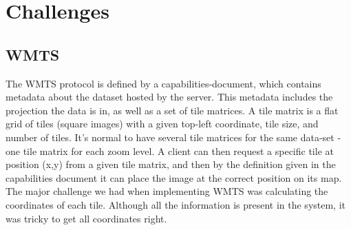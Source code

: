 \documentclass[11pt,a4paper,titlepage,oneside]{report}
\begin{document}
\chapter{Challenges}
\label{chap:Challenges}
\section{WMTS}
\label{sec:WMTS}
The \gls{WMTS} \gls{protocol} is defined by a capabilities-document, which contains metadata about the dataset hosted by the server. This metadata includes the projection the data is in, as well as a set of tile matrices.  
A tile matrix is a flat grid of tiles (square images) with a given top-left coordinate, tile size, and number of tiles. It's normal to have several tile matrices for the same data-set - one tile matrix for each zoom level.  
A client can then request a specific tile at position (x,y) from a given tile matrix, and then by the definition given in the capabilities document it can place the image at the correct position on its map.  
The major challenge we had when implementing \gls{WMTS} was calculating the coordinates of each tile. Although all the information is present in the system, it was tricky to get all coordinates right. 
\end{document}
